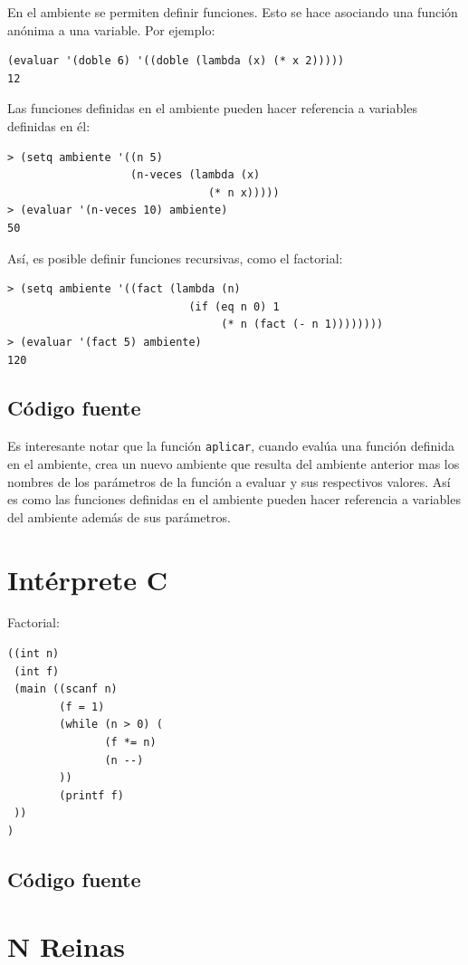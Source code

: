 \documentclass[12pt,titlepage]{article}
\begin{document}
En el ambiente se permiten definir funciones. Esto se hace asociando una función anónima a una variable. Por ejemplo:
\begin{lstlisting}
(evaluar '(doble 6) '((doble (lambda (x) (* x 2)))))
12
\end{lstlisting}

Las funciones definidas en el ambiente pueden hacer referencia a variables definidas en él:
\begin{lstlisting}
> (setq ambiente '((n 5) 
                   (n-veces (lambda (x) 
                               (* n x)))))
> (evaluar '(n-veces 10) ambiente)
50
\end{lstlisting}

Así, es posible definir funciones recursivas, como el factorial:
\begin{lstlisting}
> (setq ambiente '((fact (lambda (n) 
                            (if (eq n 0) 1
                                 (* n (fact (- n 1))))))))
> (evaluar '(fact 5) ambiente)
120
\end{lstlisting}

\subsection{Código fuente}



Es interesante notar que la función \lstinline|aplicar|, cuando evalúa una función definida en el ambiente, crea un nuevo ambiente que resulta del ambiente anterior mas los nombres de los parámetros de la función a evaluar y sus respectivos valores. Así es como las funciones definidas en el ambiente pueden hacer referencia a variables del ambiente además de sus parámetros.

\section{Intérprete C}

Factorial:
\begin{lstlisting}
((int n)
 (int f)
 (main ((scanf n)
        (f = 1)
        (while (n > 0) (
               (f *= n)
               (n --)
        ))
        (printf f)
 ))
)
\end{lstlisting}

\subsection{Código fuente}



\section{N Reinas}

\end{document}
